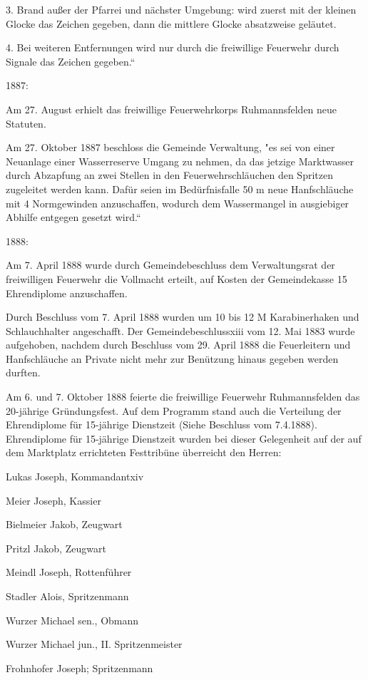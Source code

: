 \documentclass{book}
\begin{document}
3. Brand außer der Pfarrei und nächster Umgebung: wird zuerst mit der kleinen
Glocke das Zeichen gegeben, dann die mittlere Glocke absatzweise geläutet.

4. Bei weiteren Entfernungen wird nur durch die freiwillige Feuerwehr durch
Signale das Zeichen gegeben.“

1887:

Am 27. August erhielt das freiwillige Feuerwehrkorps Ruhmannsfelden neue
Statuten.

Am 27. Oktober 1887 beschloss die Gemeinde Verwaltung, "es sei von einer
Neuanlage einer Wasserreserve Umgang zu nehmen, da das jetzige Marktwasser durch
Abzapfung an zwei Stellen in den Feuerwehrschläuchen den Spritzen zugeleitet
werden kann. Dafür seien im Bedürfnisfalle 50 m neue Hanfschläuche mit 4
Normgewinden anzuschaffen, wodurch dem Wassermangel in ausgiebiger Abhilfe
entgegen gesetzt wird.“

1888:

Am 7. April 1888 wurde durch Gemeindebeschluss dem Verwaltungsrat der
freiwilligen Feuerwehr die Vollmacht erteilt, auf Kosten der Gemeindekasse 15
Ehrendiplome anzuschaffen.

Durch Beschluss vom 7. April 1888 wurden um 10 bis 12 M Karabinerhaken und
Schlauchhalter angeschafft. Der Gemeindebeschlussxiii vom 12. Mai 1883 wurde
aufgehoben, nachdem durch Beschluss vom 29. April 1888 die Feuerleitern und
Hanfschläuche an Private nicht mehr zur Benützung hinaus gegeben werden durften.

Am 6. und 7. Oktober 1888 feierte die freiwillige Feuerwehr Ruhmannsfelden das
20-jährige Gründungsfest. Auf dem Programm stand auch die Verteilung der
Ehrendiplome für 15-jährige Dienstzeit (Siehe Beschluss vom 7.4.1888).
Ehrendiplome für 15-jährige Dienstzeit wurden bei dieser Gelegenheit auf der auf
dem Marktplatz errichteten Festtribüne überreicht den Herren:



Lukas Joseph, Kommandantxiv

Meier Joseph, Kassier

Bielmeier Jakob, Zeugwart

Pritzl Jakob, Zeugwart

Meindl Joseph, Rottenführer

Stadler Alois, Spritzenmann

Wurzer Michael sen., Obmann

Wurzer Michael jun., II. Spritzenmeister

Frohnhofer Joseph; Spritzenmann
\end{document}
